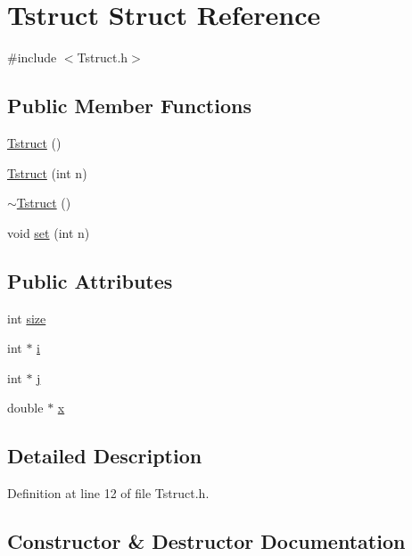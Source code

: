 \hypertarget{structTstruct}{}\section{Tstruct Struct Reference}
\label{structTstruct}


{\ttfamily \#include $<$Tstruct.\+h$>$}

\subsection*{Public Member Functions}
\begin{DoxyCompactItemize}
\item 
\hyperlink{structTstruct_af5f2f8d1a2b11d065dc479a761a7619f}{Tstruct} ()
\item 
\hyperlink{structTstruct_a935b2752cee46ed2c9d4e76a344bdbf0}{Tstruct} (int n)
\item 
\hyperlink{structTstruct_ac50ed5735a37a3d90fed214c86ddab09}{$\sim$\+Tstruct} ()
\item 
void \hyperlink{structTstruct_a24d54c3caa12f19669ea826c3c5b7e9d}{set} (int n)
\end{DoxyCompactItemize}
\subsection*{Public Attributes}
\begin{DoxyCompactItemize}
\item 
int \hyperlink{structTstruct_af22c0d91803bee735b321f3c5bf7b1c7}{size}
\item 
int $\ast$ \hyperlink{structTstruct_a1d62e8ec1881ec488a1428f5fe023ec6}{i}
\item 
int $\ast$ \hyperlink{structTstruct_a6a815650d34c388525adf997bb518ba1}{j}
\item 
double $\ast$ \hyperlink{structTstruct_a1f9679d8553f8f0be6b1ea1e7c3ade80}{x}
\end{DoxyCompactItemize}


\subsection{Detailed Description}


Definition at line 12 of file Tstruct.\+h.



\subsection{Constructor \& Destructor Documentation}
\mbox{\label{structTstruct_af5f2f8d1a2b11d065dc479a761a7619f}} 

